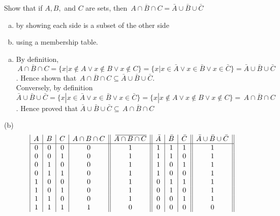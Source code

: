 \documentclass[addpoints]{exam}
\newcommand{\olsi}[1]{\,\overline{\!{#1}}} %
\newenvironment{problem}[2][Problem]{\begin{trivlist}
\item[\hskip \labelsep {\bfseries #1}\hskip \labelsep {\bfseries #2.}]}{\end{trivlist}}
\begin{document}
\begin{sloppypar}
    \begin{problem}{12}[Chapter 2.2, Question 19]
    Show that if $A,B,$ and $C$ are sets, then $ \olsi{A \cap B \cap C} = \bar{A} \cup \bar{B} \cup \bar{C}$
    \begin{enumerate}[(a)]
        \item by showing each side is a subset of the other side
        \item using a membership table.
    \end{enumerate}
    \end{problem}

    \begin{questions}
        \question
        \begin{solution}
            
            \begin{enumerate}[(a)]
                \item By definition, $ \olsi{A \cap B \cap C} = \{ x | x \notin A \lor x \notin B \lor x \notin C \} = \{ x | x \in \bar{A} \lor x \in \bar{B} \lor x \in \bar{C} \} = \bar{A} \cup \bar{B} \cup \bar{C} $. Hence shown that $ \olsi{A \cap B \cap C} \subseteq \bar{A} \cup \bar{B} \cup \bar{C} $. \\ Conversely, by definition $ \bar{A} \cup \bar{B} \cup \bar{C} = \{ x | x \in \bar{A} \lor x \in \bar{B} \lor x \in \bar{C} \} = \{ x | x \notin A \lor x \notin B \lor x \notin C \} = \olsi{A \cap B \cap C} $. Hence proved that $ \bar{A} \cup \bar{B} \cup \bar{C} \subseteq \olsi{A \cap B \cap C} $  
            \end{enumerate}

            \hspace*{2.5mm}(b) \[ 
                \begin{array}{| c | c | c | c || c || c | c |c || c || }
                    A & B & C & A \cap B \cap C & \olsi{A \cap B \cap C} & \bar{A} & \bar{B} & \bar{C} & \bar{A} \cup \bar{B} \cup \bar{C} \\ 
                    \hline
                    0 & 0 & 0 & 0 & 1 & 1 & 1 & 1 & 1 \\ 
                    0 & 0 & 1 & 0 & 1 & 1 & 1 & 0 & 1 \\ 
                    0 & 1 & 0 & 0 & 1 & 1 & 0 & 1 & 1 \\ 
                    0 & 1 & 1 & 0 & 1 & 1 & 0 & 0 & 1 \\
                    1 & 0 & 0 & 0 & 1 & 0 & 1 & 1 & 1 \\ 
                    1 & 0 & 1 & 0 & 1 & 0 & 1 & 0 & 1 \\
                    1 & 1 & 0 & 0 & 1 & 0 & 0 & 1 & 1 \\ 
                    1 & 1 & 1 & 1 & 0 & 0 & 0 & 0 & 0
                \end{array}
                \]


\end{solution}
\end{questions}
\end{sloppypar}
\end{document}
